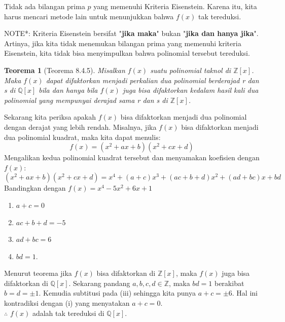 \documentclass[10pt,openany,a4paper]{article}
\newtheorem*{teorema}{Teorema}
\newcommand{\Z}{\mathbb{Z}}
\newcommand{\Q}{\mathbb{Q}}
\begin{document}
\begin{enumerate}
Tidak ada bilangan prima \( p \) yang memenuhi Kriteria Eisenstein. Karena itu, kita harus mencari metode lain untuk menunjukkan bahwa \( f(x) \) tak tereduksi.

{\color{red} NOTE*: Kriteria Eisenstein bersifat "\textbf{jika maka}" bukan "\textbf{jika dan hanya jika}". Artinya, jika kita tidak menemukan bilangan prima yang memenuhi kriteria Eisenstein, kita tidak bisa menyimpulkan bahwa polinomial tersebut tereduksi.}

\begin{teorema}[Teorema 8.4.5]
Misalkan $f(x)$ suatu polinomial taknol di $\Z[x]$. Maka $f(x)$ dapat difaktorkan
menjadi perkalian dua polinomial berderajad r dan s di $\Q[x]$ bila dan hanya bila $f(x)$ juga
bisa difaktorkan kedalam hasil kali dua polinomial yang mempunyai derajad sama r dan s
di $\Z[x]$.
\end{teorema}
Sekarang kita periksa apakah \( f(x) \) bisa difaktorkan menjadi dua polinomial dengan derajat yang lebih rendah. Misalnya, jika \( f(x) \) bisa difaktorkan menjadi dua polinomial kuadrat, maka kita dapat menulis:
\[
f(x) = (x^2 + ax + b)(x^2 + cx + d)
\]
Mengalikan kedua polinomial kuadrat tersebut dan menyamakan koefisien dengan \( f(x) \):
\[
(x^2 + ax + b)(x^2 + cx + d) = x^4 + (a+c)x^3 + (ac+b+d)x^2 + (ad+bc)x + bd
\]
Bandingkan dengan \( f(x) = x^4 - 5x^2 + 6x + 1 \)
\begin{enumerate}[label=(\roman*)]
    \item \( a+c = 0 \)
    \item \( ac + b + d = -5 \)
    \item \( ad + bc = 6 \)
    \item \( bd = 1 \).
\end{enumerate}

Menurut teorema jika \( f(x) \) bisa difaktorkan di $\Z[x]$, maka \( f(x) \) juga bisa difaktorkan di $\Q[x]$. 
Sekarang pandang $a,b,c,d\in\Z$, maka $bd=1$ berakibat $b=d=\pm 1$.  Kemudia subtitusi pada (iii) sehingga kita punya $a+c=\pm 6$.
Hal ini kontradiksi dengan (i) yang menyatakan $a+c=0$.\\

$\therefore$ $f(x)$ adalah tak tereduksi di $\Q[x]$.


\end{enumerate}
\end{document}
